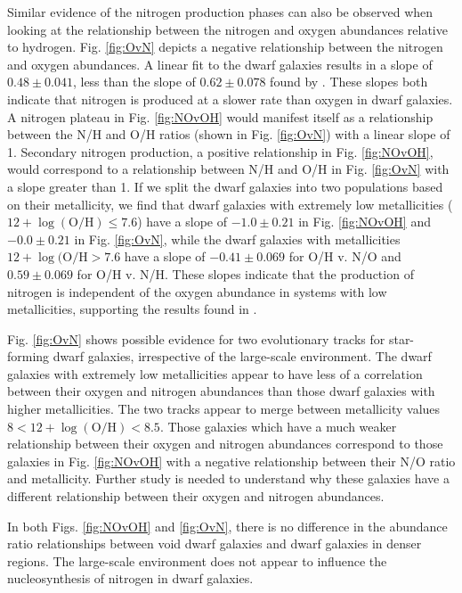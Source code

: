 Similar evidence of the nitrogen production phases can also be observed when 
looking at the relationship between the nitrogen and oxygen abundances relative 
to hydrogen.  Fig. \ref{fig:OvN} depicts a negative relationship between the 
nitrogen and oxygen abundances.  A linear fit to the dwarf galaxies results in a 
slope of $0.48\pm 0.041$, less than the slope of $0.62\pm 0.078$ found by 
\cite{Douglass17b}.  These slopes both indicate that nitrogen is produced at a 
slower rate than oxygen in dwarf galaxies.  A nitrogen plateau in Fig. 
\ref{fig:NOvOH} would manifest itself as a relationship between the N/H and O/H 
ratios (shown in Fig. \ref{fig:OvN}) with a linear slope of 1.  Secondary 
nitrogen production, a positive relationship in Fig. \ref{fig:NOvOH}, would 
correspond to a relationship between N/H and O/H in Fig. \ref{fig:OvN} with a 
slope greater than 1.  If we split the dwarf galaxies into two populations based 
on their metallicity, we find that dwarf galaxies with extremely low 
metallicities ($12 + \log (\text{O}/\text{H}) \leq 7.6$) have a slope of 
$-1.0\pm 0.21$ in Fig. \ref{fig:NOvOH} and $-0.0\pm 0.21$ in Fig. \ref{fig:OvN}, 
while the dwarf galaxies with metallicities $12 + \log(\text{O}/\text{H} > 7.6$ 
have a slope of $-0.41\pm 0.069$ for O/H v. N/O and $0.59\pm 0.069$ for O/H v. 
N/H.  These slopes indicate that the production of nitrogen is independent of 
the oxygen abundance in systems with low metallicities, supporting the results 
found in \cite{Douglass17b}.

Fig. \ref{fig:OvN} shows possible evidence for two evolutionary tracks for 
star-forming dwarf galaxies, irrespective of the large-scale environment.  The 
dwarf galaxies with extremely low metallicities appear to have less of a 
correlation between their oxygen and nitrogen abundances than those dwarf 
galaxies with higher metallicities.  The two tracks appear to merge between 
metallicity values $8 < 12 + \log(\text{O}/\text{H}) < 8.5$.  Those galaxies 
which have a much weaker relationship between their oxygen and nitrogen 
abundances correspond to those galaxies in Fig. \ref{fig:NOvOH} with a negative 
relationship between their N/O ratio and metallicity.  Further study is needed 
to understand why these galaxies have a different relationship between their 
oxygen and nitrogen abundances.

In both Figs. \ref{fig:NOvOH} and \ref{fig:OvN}, there is no difference in the 
abundance ratio relationships between void dwarf galaxies and dwarf galaxies in 
denser regions.  The large-scale environment does not appear to influence the 
nucleosynthesis of nitrogen in dwarf galaxies.


